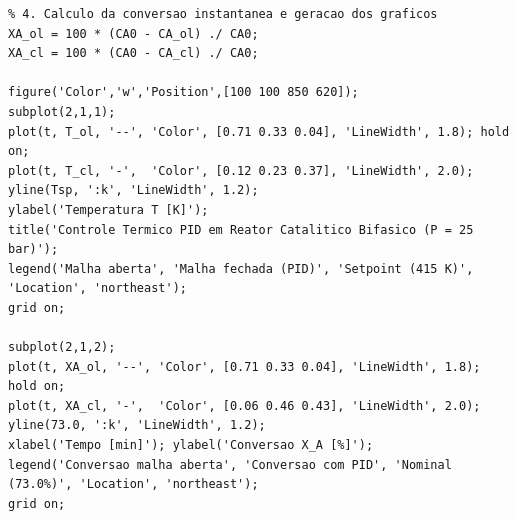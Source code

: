 \documentclass[11pt, a4paper]{article}
\begin{document}
\begin{lstlisting}
% 4. Calculo da conversao instantanea e geracao dos graficos
XA_ol = 100 * (CA0 - CA_ol) ./ CA0;
XA_cl = 100 * (CA0 - CA_cl) ./ CA0;

figure('Color','w','Position',[100 100 850 620]);
subplot(2,1,1);
plot(t, T_ol, '--', 'Color', [0.71 0.33 0.04], 'LineWidth', 1.8); hold on;
plot(t, T_cl, '-',  'Color', [0.12 0.23 0.37], 'LineWidth', 2.0);
yline(Tsp, ':k', 'LineWidth', 1.2);
ylabel('Temperatura T [K]');
title('Controle Termico PID em Reator Catalitico Bifasico (P = 25 bar)');
legend('Malha aberta', 'Malha fechada (PID)', 'Setpoint (415 K)', 'Location', 'northeast');
grid on;

subplot(2,1,2);
plot(t, XA_ol, '--', 'Color', [0.71 0.33 0.04], 'LineWidth', 1.8); hold on;
plot(t, XA_cl, '-',  'Color', [0.06 0.46 0.43], 'LineWidth', 2.0);
yline(73.0, ':k', 'LineWidth', 1.2);
xlabel('Tempo [min]'); ylabel('Conversao X_A [%]');
legend('Conversao malha aberta', 'Conversao com PID', 'Nominal (73.0%)', 'Location', 'northeast');
grid on;
\end{lstlisting}
\end{document}
